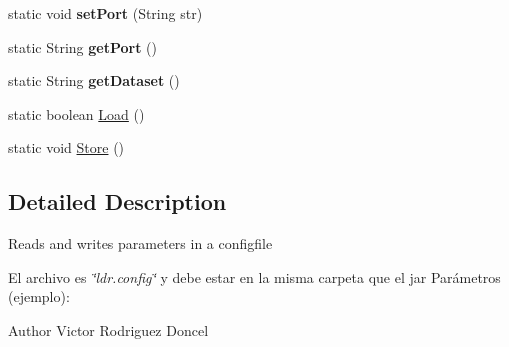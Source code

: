 \begin{DoxyCompactItemize}
\item 
\hypertarget{classodrlmodel_1_1_l_d_r_config_a9b86027da393b55c7f6bf988c99a90e5}{static void {\bfseries set\-Port} (String str)}\label{classodrlmodel_1_1_l_d_r_config_a9b86027da393b55c7f6bf988c99a90e5}

\item 
\hypertarget{classodrlmodel_1_1_l_d_r_config_accd00c860dea0b5b15663fa205761e12}{static String {\bfseries get\-Port} ()}\label{classodrlmodel_1_1_l_d_r_config_accd00c860dea0b5b15663fa205761e12}

\item 
\hypertarget{classodrlmodel_1_1_l_d_r_config_a62ecf5e5299d46f77bacf5c31473b3db}{static String {\bfseries get\-Dataset} ()}\label{classodrlmodel_1_1_l_d_r_config_a62ecf5e5299d46f77bacf5c31473b3db}

\item 
static boolean \hyperlink{classodrlmodel_1_1_l_d_r_config_aa98419a5b5f87f457bb176035986d439}{Load} ()
\item 
static void \hyperlink{classodrlmodel_1_1_l_d_r_config_a9a89297e7d7ce894a22a3087f11c9af4}{Store} ()
\end{DoxyCompactItemize}


\subsection{Detailed Description}
Reads and writes parameters in a configfile

El archivo es {\itshape \char`\"{}ldr.\-config\char`\"{}} y debe estar en la misma carpeta que el jar Parámetros (ejemplo)\-: \begin{DoxyAuthor}{Author}
Victor Rodriguez Doncel 
\end{DoxyAuthor}


